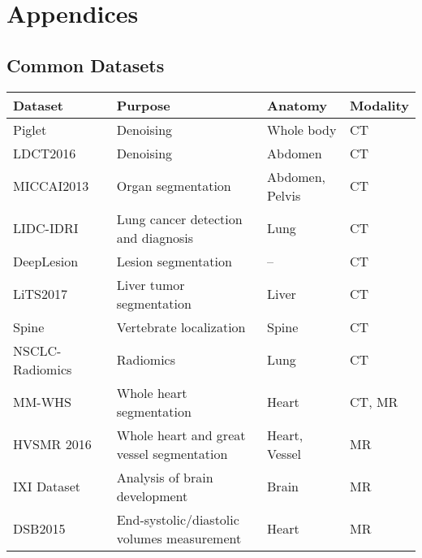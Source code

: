 \chapter*{Appendices}\label{sec:appendices}
\section{Common Datasets}\label{sec:commondataset}
\begin{longtable}{|>{\arraybackslash}p{5cm}|>{\arraybackslash}p{6cm}|>{\arraybackslash}p{1.7cm}|>{\arraybackslash}p{2.3cm}|} \hline
	
	\renewcommand{\arraystretch}{0.7}%
	\textbf{Dataset} & \textbf{Purpose} & \textbf{Anatomy} & \textbf{Modality} \\ \hline 
	
	Piglet~\cite{yi2018sharpness} &  Denoising & Whole body & CT \\
	\hline
	LDCT2016~\cite{mccollough2017low} & Denoising & Abdomen & CT \\
	\hline
	MICCAI2013~\cite{vanderbilt} & Organ segmentation & Abdomen, Pelvis & CT \\ \hline 
	
	LIDC-IDRI~\cite{xie2018fusing} &Lung cancer detection and diagnosis & Lung & CT  \\ \hline 
	
	DeepLesion\cite{yan2018deep} & Lesion segmentation & -- & CT \\ \hline 
	
	LiTS2017~\cite{CodaLab} & Liver tumor segmentation & Liver & CT \\ \hline 
	
	Spine~\cite{glocker2013vertebrae} & Vertebrate localization & Spine & CT \\ \hline 
	
	NSCLC-Radiomics~\cite{aerts2015data} & Radiomics & Lung & CT \\ \hline 
	
	MM-WHS~\cite{zhuang2016multi} & Whole heart segmentation & Heart & CT, MR \\ \hline 
	
	HVSMR 2016~\cite{pace2015interactive} & Whole heart and great vessel segmentation & Heart, Vessel & MR \\ \hline 
	
	IXI Dataset~\cite{IXI} & Analysis of brain development & Brain & MR \\ \hline 
	
	DSB2015~\cite{dsb} & End-systolic/diastolic volumes measurement & Heart & MR \\ \hline 
	

\end{longtable}
